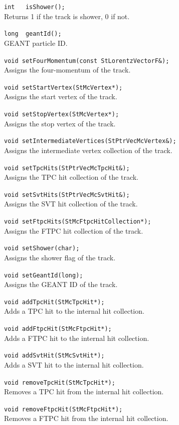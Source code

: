 \begin{Entry}
    \verb+int   isShower();+\\
    Returns 1 if the track is shower, 0 if not.

    \verb+long  geantId();+\\
    GEANT particle ID.

    \verb+void setFourMomentum(const StLorentzVectorF&);+\\
    Assigns the four-momentum of the track.

    \verb+void setStartVertex(StMcVertex*);+\\
    Assigns the start vertex of the track.

    \verb+void setStopVertex(StMcVertex*);+\\
    Assigns the stop vertex of the track.

    \verb+void setIntermediateVertices(StPtrVecMcVertex&);+\\
    Assigns the intermediate vertex collection of the track.

    \verb+void setTpcHits(StPtrVecMcTpcHit&);+\\
    Assigns the TPC hit collection of the track.

    \verb+void setSvtHits(StPtrVecMcSvtHit&);+\\
    Assigns the SVT hit collection of the track.

    \verb+void setFtpcHits(StMcFtpcHitCollection*);+\\
    Assigns the FTPC hit collection of the track.

    \verb+void setShower(char);+\\
    Assigns the shower flag of the track.

    \verb+void setGeantId(long);+\\
    Assigns the GEANT ID of the track.

    \verb+void addTpcHit(StMcTpcHit*);+\\
    Adds a TPC hit to the internal hit collection.
    
    \verb+void addFtpcHit(StMcFtpcHit*);+\\
    Adds a FTPC hit to the internal hit collection.

    \verb+void addSvtHit(StMcSvtHit*);+\\
    Adds a SVT hit to the internal hit collection.

    \verb+void removeTpcHit(StMcTpcHit*);+\\
    Removes a TPC hit from the internal hit collection.

    \verb+void removeFtpcHit(StMcFtpcHit*);+\\
    Removes a FTPC hit from the internal hit collection.


\end{Entry}
